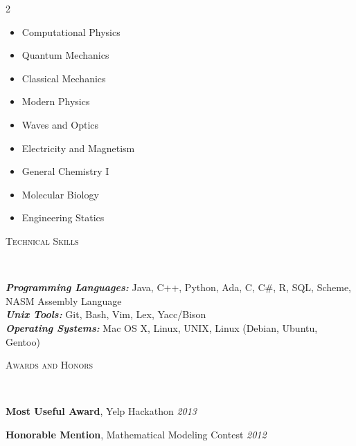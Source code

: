 \documentclass[9pt]{article}
\newenvironment{changemargin}[2]{%
  \begin{list}{}{%
    \setlength{\topsep}{0pt}%
    \setlength{\leftmargin}{#1}%
    \setlength{\rightmargin}{#2}%
    \setlength{\listparindent}{\parindent}%
    \setlength{\itemindent}{\parindent}%
    \setlength{\parsep}{\parskip}%
  }%
  \item[]}{\end{list}
}
\newcommand{\lineover}{
    \begin{changemargin}{-0.05in}{-0.05in}
        \vspace*{-8pt}
        \hrulefill \\
        \vspace*{-2pt}
    \end{changemargin}
}
\newcommand{\header}[1]{
    \begin{changemargin}{-0.5in}{-0.5in}
        \scshape{#1}\\
        \lineover
    \end{changemargin}
}
\newenvironment{body} {
    \vspace*{-16pt}
    \begin{changemargin}{-0.20in}{-0.5in}
  }
    {\end{changemargin}
}
\begin{document}
\begin{body}
\begin{multicols}{2}
\begin{itemize}
            \item [] Computational Physics
            \item [] Quantum Mechanics
            \item [] Classical Mechanics
            \item [] Modern Physics
            \item [] Waves and Optics
            \item [] Electricity and Magnetism

            \item [] General Chemistry I
            \item [] Molecular Biology
            \item [] Engineering Statics

        \end{itemize}
    \end{multicols}
\end{body}



\header{Technical Skills}
\begin{body}
    \vspace{14pt}
    \emph{\textbf{Programming Languages:}}{} Java, C++, Python, Ada, C, C\#, R, SQL, Scheme, NASM Assembly Language\\
    \medskip
    \emph{\textbf{Unix Tools:}}{} Git, Bash, Vim, Lex, Yacc/Bison\\
    \medskip
    \emph{\textbf{Operating Systems:}}{} Mac OS X, Linux, UNIX, Linux (Debian, Ubuntu, Gentoo)\\
    \medskip
\end{body}

\smallskip



\header{Awards and Honors}

\begin{body}
    \vspace{14pt}


    \textbf{Most Useful Award}, Yelp Hackathon \hfill{} \emph{2013}\\
    \smallskip

    \textbf{Honorable Mention}, Mathematical Modeling Contest \hfill{} \emph{2012}\\

\end{body}
\end{document}
